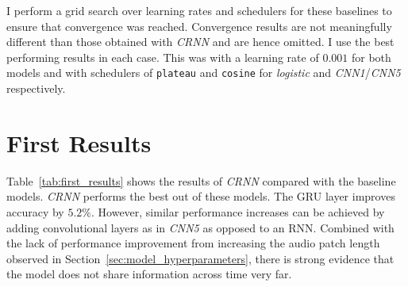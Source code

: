 I perform a grid search over learning rates and schedulers for these baselines to ensure that convergence was reached. Convergence results are not meaningfully different than those obtained with \emph{CRNN} and are hence omitted. I use the best performing results in each case. This was with a learning rate of $0.001$ for both models and with schedulers of \texttt{plateau} and \texttt{cosine} for \emph{logistic} and \emph{CNN1}/\emph{CNN5} respectively.



\section{First Results}

Table~\ref{tab:first_results} shows the results of \emph{CRNN} compared with the baseline models. \emph{CRNN} performs the best out of these models. The GRU layer improves accuracy by $5.2\%$. However, similar performance increases can be achieved by adding convolutional layers as in \emph{CNN5} as opposed to an RNN. Combined with the lack of performance improvement from increasing the audio patch length observed in Section~\ref{sec:model_hyperparameters}, there is strong evidence that the model does not share information across time very far.

